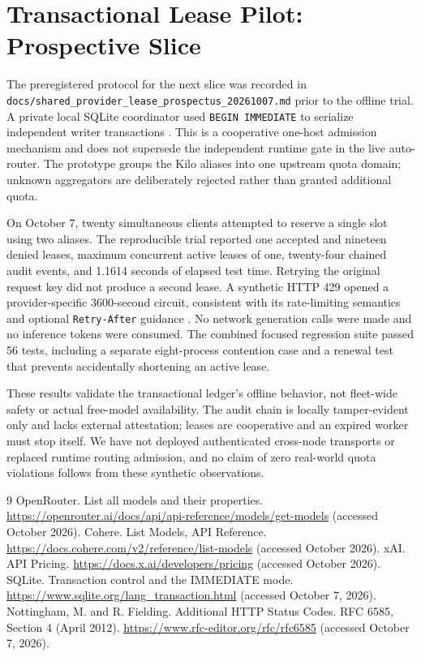 \documentclass[11pt]{article}
\begin{document}
\section{Transactional Lease Pilot: Prospective Slice}
The preregistered protocol for the next slice was recorded in
\texttt{docs/shared\_provider\_lease\_prospectus\_20261007.md} prior
to the offline trial. A private local SQLite coordinator used
\texttt{BEGIN IMMEDIATE} to serialize independent writer transactions
\cite{sqlite}. This is a cooperative one-host admission mechanism and
does not supersede the independent runtime gate in the live auto-router.
The prototype groups the Kilo aliases into one upstream quota domain;
unknown aggregators are deliberately rejected rather than granted
additional quota.

On October 7, twenty simultaneous clients attempted to reserve a
single slot using two aliases. The reproducible trial reported
one accepted and nineteen denied leases, maximum concurrent active
leases of one, twenty-four chained audit events, and 1.1614 seconds of
elapsed test time. Retrying the original request key did not produce
a second lease. A synthetic HTTP 429 opened a provider-specific
3600-second circuit, consistent with its rate-limiting semantics and
optional \texttt{Retry-After} guidance \cite{rfc6585}. No network
generation calls were made and no inference tokens were consumed.
The combined focused regression suite passed 56 tests, including
a separate eight-process contention case and a renewal test that
prevents accidentally shortening an active lease.

These results validate the transactional ledger's offline behavior,
not fleet-wide safety or actual free-model availability. The audit
chain is locally tamper-evident only and lacks external attestation;
leases are cooperative and an expired worker must stop itself. We
have not deployed authenticated cross-node transports or replaced
runtime routing admission, and no claim of zero real-world quota
violations follows from these synthetic observations.

\begin{thebibliography}{9}
 OpenRouter. List all models and their properties.
\url{https://openrouter.ai/docs/api/api-reference/models/get-models}
(accessed October 2026).
 Cohere. List Models, API Reference.
\url{https://docs.cohere.com/v2/reference/list-models}
(accessed October 2026).
 xAI. API Pricing.
\url{https://docs.x.ai/developers/pricing}
(accessed October 2026).
 SQLite. Transaction control and the IMMEDIATE mode.
\url{https://www.sqlite.org/lang_transaction.html}
(accessed October 7, 2026).
 Nottingham, M. and R. Fielding.
Additional HTTP Status Codes. RFC 6585, Section 4 (April 2012).
\url{https://www.rfc-editor.org/rfc/rfc6585}
(accessed October 7, 2026).
\end{thebibliography}
\end{document}
